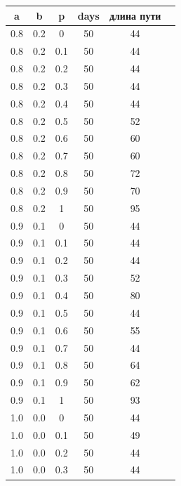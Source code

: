 \documentclass[12pt]{report}
\begin{document}
\begin{table}[!h]
	\begin{center}
		\begin{tabular}{c@{\hspace{7mm}}c@{\hspace{7mm}}c@{\hspace{7mm}}c@{\hspace{7mm}}c@{\hspace{7mm}}c}
			\toprule
			a        &b      &p      &days &длина пути \\
			\midrule
			0.8     &0.2    &0      &50    &44\\
			0.8     &0.2    &0.1    &50    &44\\
			0.8     &0.2    &0.2    &50    &44\\
			0.8     &0.2    &0.3    &50    &44\\
			0.8     &0.2    &0.4    &50    &44\\
			0.8     &0.2    &0.5    &50    &52\\
			0.8     &0.2    &0.6    &50    &60\\
			0.8     &0.2    &0.7    &50    &60\\
			0.8     &0.2    &0.8    &50    &72\\
			0.8     &0.2    &0.9    &50    &70\\
			0.8     &0.2    &1      &50     &95\\
			\midrule
			0.9     &0.1    &0      &50    &44\\
			0.9     &0.1    &0.1    &50    &44\\
			0.9     &0.1    &0.2    &50    &44\\
			0.9     &0.1    &0.3    &50    &52\\
			0.9     &0.1    &0.4    &50    &80\\
			0.9     &0.1    &0.5    &50    &44\\
			0.9     &0.1    &0.6    &50    &55\\
			0.9     &0.1    &0.7    &50    &44\\
			0.9     &0.1    &0.8    &50    &64\\
			0.9     &0.1    &0.9    &50   &62\\
			0.9     &0.1    &1      &50    &93\\
			\midrule
			1.0     &0.0    &0      &50    &44\\
			1.0     &0.0    &0.1    &50    &49\\
			1.0     &0.0    &0.2    &50    &44\\
			1.0     &0.0    &0.3    &50    &44\\

\end{tabular}
\end{center}
\end{table}
\end{document}
